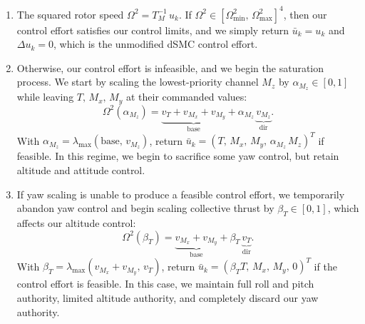 \documentclass[conf]{new-aiaa}
\begin{document}
\begin{enumerate}
\item The squared rotor speed $\Omega^2 = T_M^{-1}\, u_k$. If $\Omega^2 \in [\Omega^2_{\min},\, \Omega^2_{\max}]^4$, then our control effort satisfies our control limits, and we simply return $\bar u_k = u_k$ and $\Delta u_k = 0$, which is the unmodified dSMC control effort.

\item Otherwise, our control effort is infeasible, and we begin the saturation process. We start by scaling the lowest-priority channel $M_z$ by $\alpha_{M_z} \in [0, 1]$ while leaving $T,\, M_x,\, M_y$ at their commanded values:
\small
\begin{equation}
\label{eq:sat-stage1}
\Omega^2(\alpha_{M_z}) = \underbrace{v_T + v_{M_x} + v_{M_y}}_{\text{base}} + \alpha_{M_z}\, \underbrace{v_{M_z}}_{\text{dir}}.
\end{equation}
\normalsize
With $\alpha_{M_z} = \lambda_{\max}(\text{base},\, v_{M_z})$, return $\bar u_k = (T,\, M_x,\, M_y,\, \alpha_{M_z}\, M_z)^T$ if feasible. In this regime, we begin to sacrifice some yaw control, but retain altitude and attitude control.

\item If yaw scaling is unable to produce a feasible control effort, we temporarily abandon yaw control and begin scaling collective thrust by $\beta_T \in [0, 1]$, which affects our altitude control:
\small
\begin{equation}
\label{eq:sat-stage2}
\Omega^2(\beta_T) = \underbrace{v_{M_x} + v_{M_y}}_{\text{base}} + \beta_T\, \underbrace{v_T}_{\text{dir}}.
\end{equation}
\normalsize
With $\beta_T = \lambda_{\max}(v_{M_x} + v_{M_y},\, v_T)$, return $\bar u_k = (\beta_T T,\, M_x,\, M_y,\, 0)^T$ if the control effort is feasible. In this case, we maintain full roll and pitch authority, limited altitude authority, and completely discard our yaw authority. 


\end{enumerate}
\end{document}
